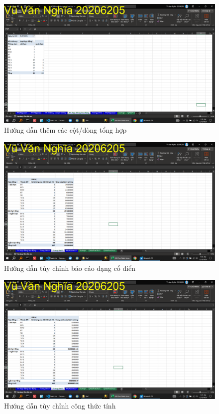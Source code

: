 \documentclass{article}
\begin{document}
\begin{figure}[H]
    \centering
    \includegraphics[scale = 0.15]{Bai1/HuongDan/5.png}
    \caption{Hướng dẫn thêm các cột/dòng tổng hợp}
\end{figure}



\begin{figure}[H]
    \centering
    \includegraphics[scale = 0.15]{Bai1/HuongDan/6.png}
    \caption{Hướng dẫn tùy chỉnh báo cáo dạng cổ điển}
\end{figure}



\begin{figure}[H]
    \centering
    \includegraphics[scale = 0.15]{Bai1/HuongDan/7.png}
    \caption{Hướng dẫn tùy chỉnh công thức tính}
\end{figure}
\end{document}
